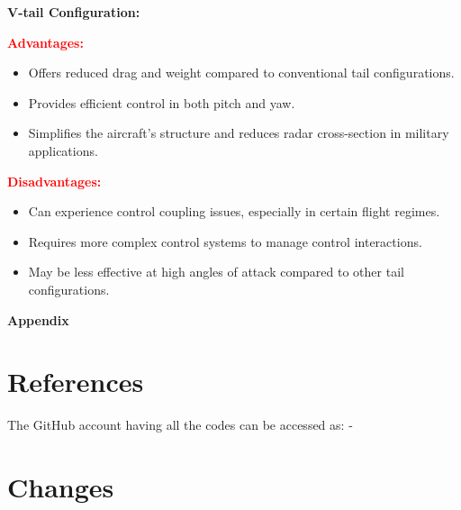 \documentclass[12 pt]{article}
\begin{document}
{{\color{red}\textbf{V-tail Configuration:}}

{\color{black}
\textbf{\textcolor{red}{Advantages:}}
\begin{itemize}
  \item Offers reduced drag and weight compared to conventional tail configurations.
  \item Provides efficient control in both pitch and yaw.
  \item Simplifies the aircraft's structure and reduces radar cross-section in military applications.
\end{itemize}

\textbf{\textcolor{red}{Disadvantages:}}
\begin{itemize}
  \item Can experience control coupling issues, especially in certain flight regimes.
  \item Requires more complex control systems to manage control interactions.
  \item May be less effective at high angles of attack compared to other tail configurations.
\end{itemize}


\vfill

\clearpage


\newpage
\textbf{\Huge{Appendix}}
\appendix


\section{References}
%



\vspace{10 pt}

The GitHub account having all the codes can be accessed as: - 

\href{https://github.com/abhijeetmangela/Group_7_design.git}{}

\newpage

\section{Changes}

}}
\end{document}
